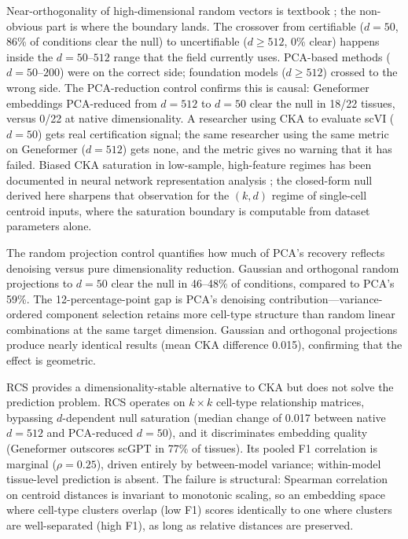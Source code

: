 \documentclass[11pt]{article}
\begin{document}
Near-orthogonality of high-dimensional random vectors is textbook
\citep{johnsonlindenstrauss1984}; the non-obvious part is where the
boundary lands. The crossover from certifiable ($d = 50$, 86\% of
conditions clear the null) to uncertifiable ($d \geq 512$, 0\% clear)
happens inside the $d = 50$--$512$ range that the field currently uses.
PCA-based methods ($d = 50$--$200$) were on the correct side; foundation
models ($d \geq 512$) crossed to the wrong side. The PCA-reduction
control confirms this is causal: Geneformer embeddings PCA-reduced from
$d = 512$ to $d = 50$ clear the null in 18/22 tissues, versus 0/22 at
native dimensionality. A researcher using CKA to evaluate scVI
($d = 50$) gets real certification signal; the same researcher using the
same metric on Geneformer ($d = 512$) gets none, and the metric gives no
warning that it has failed. Biased CKA saturation in low-sample,
high-feature regimes has been documented in neural network
representation analysis \citep{murphy2024debiasedcka}; the closed-form
null derived here sharpens that observation for the $(k, d)$ regime of
single-cell centroid inputs, where the saturation boundary is computable
from dataset parameters alone.

The random projection control quantifies how much of PCA's recovery
reflects denoising versus pure dimensionality reduction. Gaussian and
orthogonal random projections to $d = 50$ clear the null in 46--48\%
of conditions, compared to PCA's 59\%. The 12-percentage-point gap is
PCA's denoising contribution---variance-ordered component selection
retains more cell-type structure than random linear combinations at
the same target dimension. Gaussian and orthogonal projections produce
nearly identical results (mean CKA difference 0.015), confirming that
the effect is geometric.

RCS provides a dimensionality-stable alternative to CKA but does not
solve the prediction problem. RCS operates on $k \times k$ cell-type
relationship matrices, bypassing $d$-dependent null saturation (median
change of 0.017 between native $d = 512$ and PCA-reduced $d = 50$),
and it discriminates embedding quality (Geneformer outscores scGPT in
77\% of tissues). Its pooled F1 correlation is marginal
($\rho = 0.25$), driven entirely by between-model variance; within-model
tissue-level prediction is absent. The failure is structural: Spearman
correlation on centroid distances is invariant to monotonic scaling, so
an embedding space where cell-type clusters overlap (low F1) scores
identically to one where clusters are well-separated (high F1), as long
as relative distances are preserved.
\end{document}
